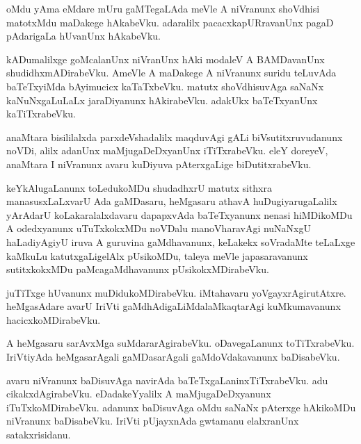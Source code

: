 \documentclass{article}
\begin{document}
\begin{mn}
oMdu yAma  eMdare  mUru  gaMTegaLAda  meVle  A  niVranunx  shoVdhisi  matotxMdu  maDakege  hAkabeVku.  
adaralilx  pacacxkapURravanUnx  pagaD  pAdarigaLa  hUvanUnx  hAkabeVku.
\end{mn}

\begin{mn}
kADumalilxge  goMcalanUnx  niVranUnx  hAki  modaleV  A  BAMDavanUnx  shudidhxmADirabeVku.  AmeVle  
A  maDakege  A  niVranunx  suridu  teLuvAda  baTeTxyiMda  bAyimucicx  kaTaTxbeVku.  matutx  
shoVdhisuvAga  saNaNx  kaNuNxgaLuLaLx  jaraDiyanunx  hAkirabeVku.  adakUkx  baTeTxyanUnx  kaTiTxrabeVku.
\end{mn}

\begin{mn}
anaMtara  bisililalxda  parxdeVshadalilx  maqduvAgi  gALi  biVsutitxruvudanunx  noVDi,  alilx  
adanUnx  maMjugaDeDxyanUnx  iTiTxrabeVku.  eleY  doreyeV,  anaMtara  I  niVranunx  avaru  
kuDiyuva  pAterxgaLige  biDutitxrabeVku.
\end{mn}

\begin{mn}
keYkAlugaLanunx  toLedukoMDu  shudadhxrU  matutx  sithxra  manasusxLaLxvarU  Ada  gaMDasaru,  heMgasaru  
athavA  huDugiyarugaLalilx  yArAdarU  koLakaralalxdavaru  dapapxvAda  baTeTxyanunx  nenasi  hiMDikoMDu  
A  odedxyanunx  uTuTxkokxMDu  noVDalu  manoVharavAgi  nuNaNxgU  haLadiyAgiyU  iruva  A  guruvina  
gaMdhavanunx,  keLakekx  soVradaMte  teLaLxge  kaMkuLu  katutxgaLigelAlx  pUsikoMDu,  taleya  meVle  
japasaravanunx  sutitxkokxMDu  paMcagaMdhavanunx  pUsikokxMDirabeVku.
\end{mn}

\begin{mn}
juTiTxge hUvanunx  muDidukoMDirabeVku.  iMtahavaru  yoVgayxrAgirutAtxre.  heMgasAdare  avarU  IriVti  
gaMdhAdigaLiMdalaMkaqtarAgi  kuMkumavanunx  hacicxkoMDirabeVku.
\end{mn}

\begin{mn}
A  heMgasaru  sarAvxMga  suMdararAgirabeVku.  oDavegaLanunx  toTiTxrabeVku.  IriVtiyAda  heMgasarAgali  
gaMDasarAgali  gaMdoVdakavanunx  baDisabeVku.
\end{mn}

\begin{mn}
avaru  niVranunx  baDisuvAga  navirAda  baTeTxgaLaninxTiTxrabeVku.  adu  cikakxdAgirabeVku.  eDadakeYyalilx  
A  maMjugaDeDxyanunx  iTuTxkoMDirabeVku.  adanunx  baDisuvAga  oMdu  saNaNx  pAterxge  hAkikoMDu  niVranunx  
baDisabeVku.  IriVti  pUjayxnAda  gwtamanu  elalxranUnx  satakxrisidanu.
\end{mn}
\end{document}
